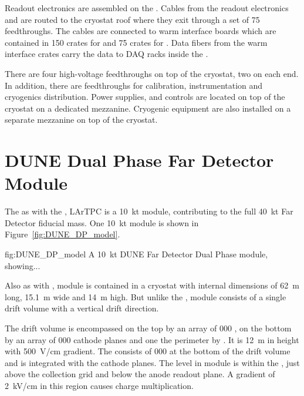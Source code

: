 Readout electronics are assembled on the . Cables from the
readout electronics and  are routed to the cryostat roof
where they exit through a set of \num{75} feedthroughs. The cables are
connected to warm interface boards which are contained in \num{150}
crates for  and \num{75} crates for . Data
fibers from the warm interface crates carry the data to DAQ racks
inside the .

There are four high-voltage feedthroughs on top of the cryostat, two on
each end. In addition, there are feedthroughs for calibration,
instrumentation and cryogenics distribution. Power supplies, and
controls are located on top of the cryostat on a dedicated
mezzanine. Cryogenic equipment are also installed on a separate
mezzanine on top of the cryostat.

\section{DUNE Dual Phase Far Detector Module}
\label{sec:fdsp-DP-module}


The as with the ,  LArTPC is a \SI{10}{\kilo\tonne} module,
contributing to the full \SI{40}{\kilo\tonne} Far Detector fiducial
mass.  One \SI{10}{\kilo\tonne} module is shown in
Figure~\ref{fig:DUNE_DP_model}.
\begin{dunefigure}{fig:DUNE_DP_model} {A \SI{10}{\kilo\tonne} DUNE Far
Detector Dual Phase module, showing...}
\end{dunefigure} 

Also as with ,  module is contained in a
cryostat with internal dimensions of \SI{62}{\meter} long,
\SI{15.1}{\meter} wide and \SI{14}{\meter} high. But unlike the
,  module consists of a single drift volume with
a vertical drift direction.

The drift volume is encompassed on the top by an array of \num{000}
, on the bottom by an array of \num{000} cathode planes and
one the perimeter by . It is \SI{12}{\meter} in height with
\SI{500}{\volt/\centi\meter} gradient. The  
consists of \num{000}  at the bottom of the drift volume
and is integrated with the cathode planes.  The  level in
 module is within the , just above the
collection grid and below the anode readout plane. A gradient of
\SI{2}{\kilo\volt/\centi\meter} in this region causes charge
multiplication.

